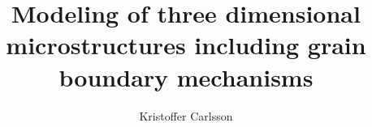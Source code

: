 \documentclass[masters,a4paper]{chalmers-thesis}
\title{Modeling of three dimensional microstructures including grain boundary mechanisms}
\author{Kristoffer Carlsson}
\begin{document}
\maketitle

\large







%

\newpage
\appendix



\newpage
\small
\printbibliography %
\end{document}
